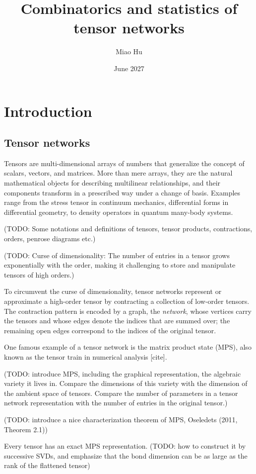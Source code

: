 \documentclass{article}
\title{Combinatorics and statistics of tensor networks}
\author{Miao Hu}
\date{June 2027}
\begin{document}
\maketitle
\tableofcontents
\section{Introduction}
\subsection{Tensor networks}

Tensors are multi-dimensional arrays of numbers that generalize the concept of scalars, vectors, and matrices. More than mere arrays, they are the natural mathematical objects for describing multilinear relationships, and their components transform in a prescribed way under a change of basis. Examples range from the stress tensor in continuum mechanics, differential forms in differential geometry, to density operators in quantum many-body systems. 

(TODO: Some notations and definitions of tensors, tensor products, contractions, orders, penrose diagrams etc.)

(TODO: Curse of dimensionality: The number of entries in a tensor grows exponentially with the order, making it challenging to store and manipulate tensors of high orders.)

To circumvent the curse of dimensionality, tensor networks represent or approximate a high-order tensor by contracting a collection of low-order tensors. The contraction pattern is encoded by a graph, the \emph{network}, whose vertices carry the tensors and whose edges denote the indices that are summed over; the remaining open edges correspond to the indices of the original tensor.

One famous example of a tensor network is the matrix product state (MPS), also known as the tensor train in numerical analysis [cite].

(TODO: introduce MPS, including the graphical representation, the algebraic variety it lives in. Compare the dimensions of this variety with the dimension of the ambient space of tensors. Compare the number of parameters in a tensor network representation with the number of entries in the original tensor.)

(TODO: introduce a nice characterization theorem of MPS, Oseledets (2011, Theorem 2.1))

Every tensor has an exact MPS representation. (TODO: how to construct it by successive SVDs, and emphasize that the bond dimension can be as large as the rank of the flattened tensor)
\end{document}
